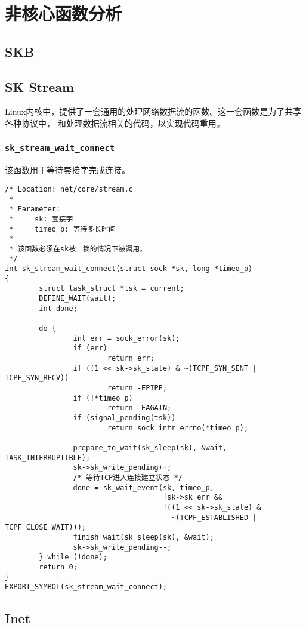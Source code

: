 \chapter{非核心函数分析}

\minitoc

\section{SKB}

\section{SK Stream}
Linux内核中，提供了一套通用的处理网络数据流的函数。这一套函数是为了共享各种协议中，
和处理数据流相关的代码，以实现代码重用。

\subsection{\texttt{sk_stream_wait_connect}}
该函数用于等待套接字完成连接。
\begin{verbatim}
/* Location: net/core/stream.c
 *
 * Parameter:
 *     sk: 套接字
 *     timeo_p: 等待多长时间
 *
 * 该函数必须在sk被上锁的情况下被调用。
 */
int sk_stream_wait_connect(struct sock *sk, long *timeo_p)
{
        struct task_struct *tsk = current;
        DEFINE_WAIT(wait);
        int done;

        do {
                int err = sock_error(sk);
                if (err)
                        return err;
                if ((1 << sk->sk_state) & ~(TCPF_SYN_SENT | TCPF_SYN_RECV))
                        return -EPIPE;
                if (!*timeo_p)
                        return -EAGAIN;
                if (signal_pending(tsk))
                        return sock_intr_errno(*timeo_p);

                prepare_to_wait(sk_sleep(sk), &wait, TASK_INTERRUPTIBLE);
                sk->sk_write_pending++;
                /* 等待TCP进入连接建立状态 */
                done = sk_wait_event(sk, timeo_p,
                                     !sk->sk_err &&
                                     !((1 << sk->sk_state) &
                                       ~(TCPF_ESTABLISHED | TCPF_CLOSE_WAIT)));
                finish_wait(sk_sleep(sk), &wait);
                sk->sk_write_pending--;
        } while (!done);
        return 0;
}
EXPORT_SYMBOL(sk_stream_wait_connect);
\end{verbatim}

\section{Inet}
